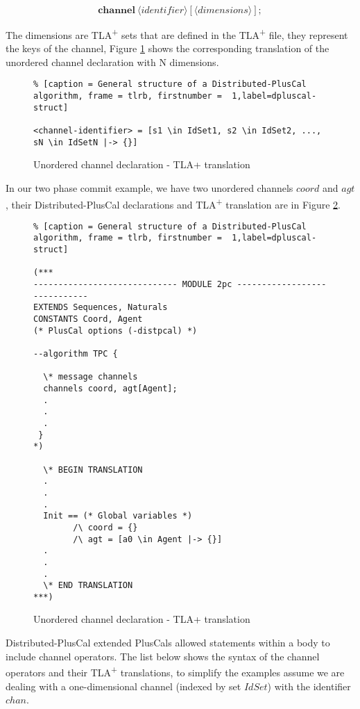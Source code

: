 \documentclass{thesul}
\newcommand{\tlaplus}{TLA\textsuperscript{+}\xspace}
\newcommand{\keyword}[1]{\textbf{#1}}
\newcommand{\entity}[1]{\ensuremath{\langle}#1\ensuremath{\rangle}}
\begin{document}
\[
 \keyword{channel}\ \entity{identifier}[\entity{dimensions}];
\]


The dimensions are \tlaplus sets that are defined in the \tlaplus file, they represent the keys of the channel, Figure \ref{unorderedtla} shows the corresponding translation of the unordered channel declaration with N dimensions.


\FloatBarrier
\begin{figure}[!h]
\begin{lstlisting}% [caption = General structure of a Distributed-PlusCal algorithm, frame = tlrb, firstnumber =  1,label=dpluscal-struct]

<channel-identifier> = [s1 \in IdSet1, s2 \in IdSet2, ..., sN \in IdSetN |-> {}]

\end{lstlisting}
\caption{Unordered channel declaration - TLA+ translation}
\label{unorderedtla}
\end{figure}
\FloatBarrier


In our two phase commit example, we have two unordered channels $coord$ and $agt$, their Distributed-PlusCal declarations and \tlaplus translation are in Figure \ref{2pcchannels}.

\FloatBarrier
\begin{figure}[!h]
\begin{lstlisting}% [caption = General structure of a Distributed-PlusCal algorithm, frame = tlrb, firstnumber =  1,label=dpluscal-struct]

(***
----------------------------- MODULE 2pc -----------------------------
EXTENDS Sequences, Naturals
CONSTANTS Coord, Agent
(* PlusCal options (-distpcal) *)
  
--algorithm TPC { 

  \* message channels
  channels coord, agt[Agent];
  .
  .
  .
 }
*)
  
  \* BEGIN TRANSLATION 
  .
  .
  .
  Init == (* Global variables *)
        /\ coord = {}
        /\ agt = [a0 \in Agent |-> {}]
  .
  .
  .      
  \* END TRANSLATION 
***)

\end{lstlisting}
\caption{Unordered channel declaration - TLA+ translation}
\label{2pcchannels}
\end{figure}
\FloatBarrier

Distributed-PlusCal extended PlusCals allowed statements within a body to include channel operators.
The list below shows the syntax of the channel operators and their \tlaplus
translations, to simplify the examples assume we are dealing with a
one-dimensional channel (indexed by set $IdSet$) with the identifier $chan$.
\end{document}
